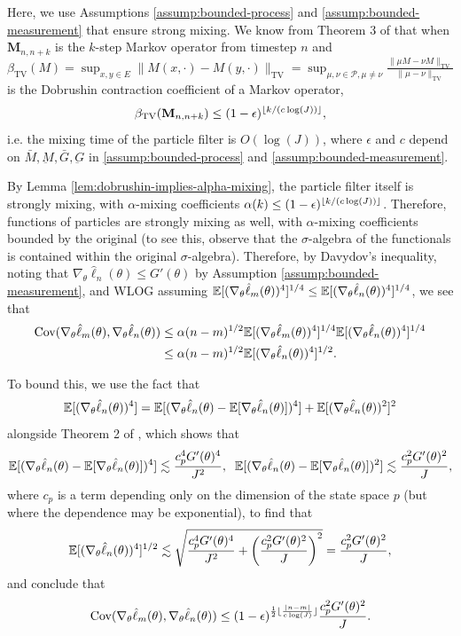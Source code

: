 \documentclass{article}
\begin{document}
Here, we use Assumptions \ref{assump:bounded-process} and \ref{assump:bounded-measurement} that ensure strong mixing. We know from Theorem 3 of \cite{karjalainen2023} that when $\textbf{M}_{n,n+k}$ is the $k$-step Markov operator from timestep $n$ and $\beta_{\text{TV}}(M) = \sup _{x, y \in E}\|M(x, \cdot)-M(y, \cdot)\|_{\mathrm{TV}}=\sup _{\mu, \nu \in \mathcal{P}, \mu \neq \nu} \frac{\|\mu M-\nu M\|_{\mathrm{TV}}}{\|\mu-\nu\|_{\mathrm{TV}}}$ is the Dobrushin contraction coefficient of a Markov operator, 
$$\beta_{\text{TV}}(\textbf{M}_{n,n+k}) \leq (1-\epsilon)^{\lfloor k/(c\log(J)) \rfloor},$$
i.e. the mixing time of the particle filter is $O(\log(J))$, where $\epsilon$ and $c$ depend on $\bar{M}, \underbar{M}, \bar{G}, \underbar{G}$ in \ref{assump:bounded-process} and \ref{assump:bounded-measurement}. 


By Lemma \ref{lem:dobrushin-implies-alpha-mixing}, the particle filter itself is strongly mixing, with $\alpha$-mixing coefficients $\alpha(k) \leq (1-\epsilon)^{\lfloor k/(c\log(J)) \rfloor}$. Therefore, functions of particles are strongly mixing as well, with $\alpha$-mixing coefficients bounded by the original (to see this, observe that the $\sigma$-algebra of the functionals is contained within the original $\sigma$-algebra). Therefore, by Davydov's inequality, noting that $\nabla_\theta\hat\ell_n(\theta)\leq G'(\theta)$ by Assumption \ref{assump:bounded-measurement}, and WLOG assuming $\mathbb{E}[(\nabla_\theta\hat\ell_m(\theta))^4]^{1/4}\leq\mathbb{E}[(\nabla_\theta\hat\ell_n(\theta))^4]^{1/4}$, we see that
\begin{align*}
    \text{Cov}(\nabla_\theta\hat\ell_m(\theta), \nabla_\theta\hat\ell_n(\theta)) 
    &\leq \alpha(n-m)^{1/2}\mathbb{E}[(\nabla_\theta\hat\ell_m(\theta))^4]^{1/4}\mathbb{E}[(\nabla_\theta\hat\ell_n(\theta))^4]^{1/4}\\
    &\leq \alpha(n-m)^{1/2}\mathbb{E}[(\nabla_\theta\hat\ell_n(\theta))^4]^{1/2}.
\end{align*}

To bound this, we use the fact that $$\mathbb{E}[(\nabla_\theta\hat\ell_n(\theta))^4] = \mathbb{E}[(\nabla_\theta\hat\ell_n(\theta)-\mathbb{E}[\nabla_\theta\hat\ell_n(\theta)])^4]+\mathbb{E}[(\nabla_\theta\hat\ell_n(\theta))^2]^2$$
alongside Theorem 2 of \cite{delMoral03}, which shows that
$$\mathbb{E}[(\nabla_\theta\hat\ell_n(\theta)-\mathbb{E}[\nabla_\theta\hat\ell_n(\theta)])^4] \lesssim \frac{c_p^4G'(\theta)^4}{J^2}, \;\; \mathbb{E}[(\nabla_\theta\hat\ell_n(\theta)-\mathbb{E}[\nabla_\theta\hat\ell_n(\theta)])^2] \lesssim \frac{c_p^2G'(\theta)^2}{J},$$
where $c_p$ is a term depending only on the dimension of the state space $p$ (but where the dependence may be exponential), to find that 
$$\mathbb{E}[(\nabla_\theta\hat\ell_n(\theta))^4]^{1/2} \lesssim  \sqrt{\frac{c_p^4G'(\theta)^4}{J^2}+\left(\frac{c_p^2G'(\theta)^2}{J}\right)^2} = \frac{c_p^2G'(\theta)^2}{J},$$
and conclude that 
$$\text{Cov}(\nabla_\theta\hat\ell_m(\theta), \nabla_\theta\hat\ell_n(\theta)) \leq (1-\epsilon)^{\frac{1}{2}\lfloor \frac{|n-m|}{c\log(J)} \rfloor}\frac{c_p^2G'(\theta)^2}{J}.$$
\end{document}
